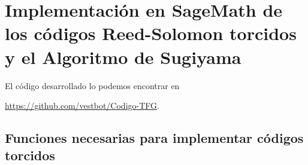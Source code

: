 \chapter[Implementación en SageMath de los códigos Reed-Solomon torcidos y el Algoritmo de Sugiyama]{Implementación en SageMath de los códigos Reed-Solomon torcidos y el Algoritmo de Sugiyama}
\label{annex:sage-Reed-Solomon}

El código desarrollado lo podemos encontrar en

\begin{center}
    \url{https://github.com/vestbot/Codigo-TFG}.
\end{center}

\section{Funciones necesarias para implementar códigos torcidos}


